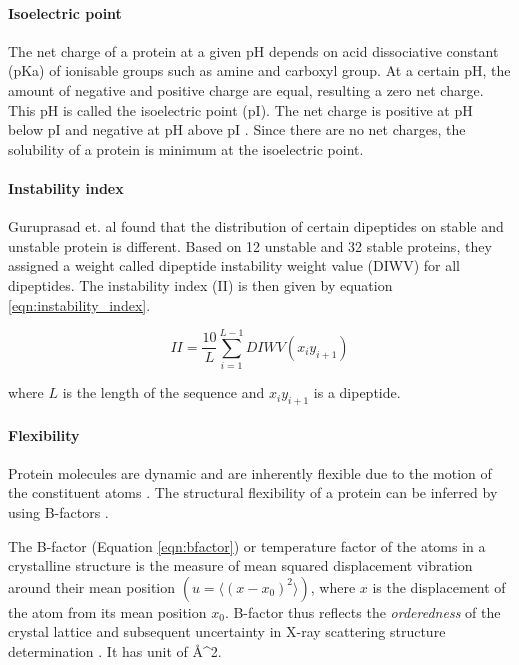 \paragraph{Isoelectric point}
The net charge of a protein at a given pH depends on acid dissociative constant (pKa) of ionisable groups such as amine and carboxyl group. At a certain pH, the amount of negative and positive charge are equal, resulting a zero net charge. This pH is called the isoelectric point (pI). The net charge is positive at pH below pI and negative at pH above pI \cite{shaw2001effect}. Since there are no net charges, the solubility of a protein is minimum at the isoelectric point.

\paragraph{Instability index}
Guruprasad et. al \cite{guruprasad1990correlation} found that the distribution of certain dipeptides on stable and unstable protein is different. Based on 12 unstable and 32 stable proteins, they assigned a weight called dipeptide instability weight value (DIWV) for all dipeptides. The instability index (II) is then given by equation \ref{eqn:instability_index}.

\begin{equation}
    II = \frac{10}{L}\sum_{i=1}^{L-1}DIWV(x_i y_{i+1})
    \label{eqn:instability_index}
\end{equation}

where $L$ is the length of the sequence and $x_i y_{i+1}$ is a dipeptide.


\paragraph{Flexibility}
Protein molecules are dynamic and are inherently flexible due to the motion of the constituent atoms \cite{vihinen1994accuracy, alvarez2014relationship, teilum2009functional}. The structural flexibility of a protein can be inferred by using B-factors \cite{vihinen1994accuracy, Karplus1985-ea, Smith2003-gb}.


The B-factor (Equation \ref{eqn:bfactor}) or temperature factor of the atoms in a crystalline structure is the measure of mean squared displacement vibration around their mean position $(u = \langle (x-x_0)^2 \rangle)$, where $x$ is the displacement of the atom from its mean position $x_0$. B-factor thus reflects the \textit{orderedness} of the crystal lattice and subsequent uncertainty in X-ray scattering structure determination \cite{Schlessinger2005-ps, Carugo2018-ka, Bramer2018-dh}. It has unit of \AA^2.


